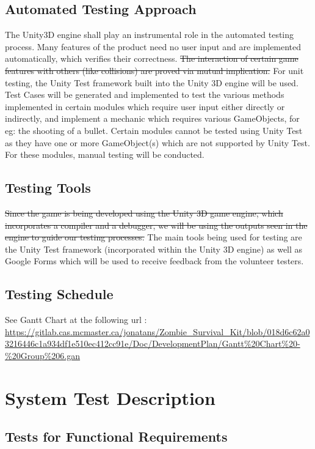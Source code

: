 \documentclass[12pt, titlepage]{article}
\DeclareRobustCommand{\hsout}[1]{\texorpdfstring{\sout{#1}}{#1}}
\begin{document}
\subsection{Automated Testing Approach}
The Unity3D engine shall play an instrumental role in the automated testing process. Many features of the product need no user input and are implemented automatically, which verifies their correctness. \hsout{The interaction of certain game features with others (like collisions) are proved via mutual implication.} {\color{magenta} For unit testing, the Unity Test framework built into the Unity 3D engine will be used. Test Cases will be generated and implemented to test the various methods implemented in certain modules which require user input either directly or indirectly, and implement a mechanic which requires various GameObjects, for eg: the shooting of a bullet.
Certain modules cannot be tested using Unity Test as they have one or more GameObject(s) which are not supported by Unity Test. For these modules, manual testing will be conducted.}

\subsection{Testing Tools}
\hsout{Since the game is being developed using the Unity 3D game engine, which incorporates a compiler and a debugger, we will be using the outputs seen in the engine to guide our testing processes.}{\color{magenta} The main tools being used for testing are the Unity Test framework (incorporated within the Unity 3D engine) as well as Google Forms which will be used to receive feedback from the volunteer testers.}

\subsection{Testing Schedule}
		
See Gantt Chart at the following url : \url{https://gitlab.cas.mcmaster.ca/jonatans/Zombie_Survival_Kit/blob/018d6c62a03216446c1a934df1e510ec412cc91e/Doc/DevelopmentPlan/Gantt%20Chart%20-%20Group%206.gan} 

\section{System Test Description}
	
\subsection{Tests for Functional Requirements}
\end{document}
